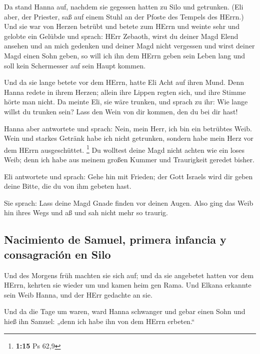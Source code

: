  Da stand Hanna auf, nachdem sie gegessen hatten zu Silo
und getrunken. (Eli aber, der Priester, saß auf einem Stuhl an der
Pfoste des Tempels des HErrn.)  Und sie war von Herzen
betrübt und betete zum HErrn und weinte sehr  und gelobte
ein Gelübde und sprach: HErr Zebaoth, wirst du deiner Magd Elend ansehen
und an mich gedenken und deiner Magd nicht vergessen und wirst deiner
Magd einen Sohn geben, so will ich ihn dem HErrn geben sein Leben lang
und soll kein Schermesser auf sein Haupt kommen.

 Und da sie lange betete vor dem HErrn, hatte Eli Acht
auf ihren Mund.  Denn Hanna redete in ihrem Herzen;
allein ihre Lippen regten sich, und ihre Stimme hörte man nicht. Da
meinte Eli, sie wäre trunken,  und sprach zu ihr: Wie
lange willst du trunken sein? Lass den Wein von dir kommen, den du bei
dir hast!

 Hanna aber antwortete und sprach: Nein, mein Herr, ich
bin ein betrübtes Weib. Wein und starkes Getränk habe ich nicht
getrunken, sondern habe mein Herz vor dem HErrn ausgeschüttet.
\footnote{\textbf{1:15} Ps 62,9}  Du wolltest deine Magd
nicht achten wie ein loses Weib; denn ich habe aus meinem großen Kummer
und Traurigkeit geredet bisher.

 Eli antwortete und sprach: Gehe hin mit Frieden; der
Gott Israels wird dir geben deine Bitte, die du von ihm gebeten hast.

 Sie sprach: Lass deine Magd Gnade finden vor deinen
Augen. Also ging das Weib hin ihres Wegs und aß und sah nicht mehr so
traurig.

\hypertarget{nacimiento-de-samuel-primera-infancia-y-consagraciuxf3n-en-silo}{%
\subsection{Nacimiento de Samuel, primera infancia y consagración en
Silo}\label{nacimiento-de-samuel-primera-infancia-y-consagraciuxf3n-en-silo}}

 Und des Morgens früh machten sie sich auf; und da sie
angebetet hatten vor dem HErrn, kehrten sie wieder um und kamen heim gen
Rama. Und Elkana erkannte sein Weib Hanna, und der HErr gedachte an sie.

 Und da die Tage um waren, ward Hanna schwanger und gebar
einen Sohn und hieß ihn Samuel: „denn ich habe ihn von dem HErrn
erbeten.``

